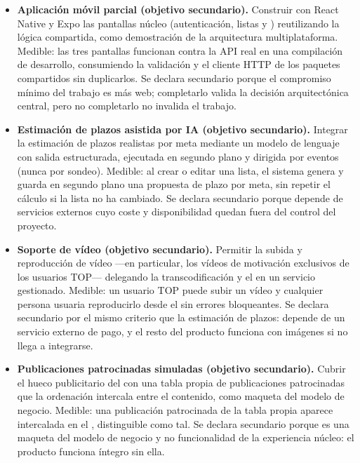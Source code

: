 \begin{itemize}
        Montar una cadena de integración continua con estrategia de fallo rápido (análisis estático, comprobación de tipos, pruebas unitarias y de integración, y pruebas \ac{E2E} como última barrera) con despliegue automático al superar todas las etapas.
        Medible: la rama principal se mantiene en verde y cada cambio validado llega a producción sin intervención manual.
  \item \textbf{Aplicación móvil parcial (objetivo secundario).}
        Construir con React Native y Expo las pantallas núcleo (autenticación, listas y ) reutilizando la lógica compartida, como demostración de la arquitectura multiplataforma.
        Medible: las tres pantallas funcionan contra la \ac{API} real en una compilación de desarrollo, consumiendo la validación y el cliente \ac{HTTP} de los paquetes compartidos sin duplicarlos.
        Se declara secundario porque el compromiso mínimo del trabajo es  más web; completarlo valida la decisión arquitectónica central, pero no completarlo no invalida el trabajo.
  \item \textbf{Estimación de plazos asistida por \ac{IA} (objetivo secundario).}
        Integrar la estimación de plazos realistas por meta mediante un modelo de lenguaje con salida estructurada, ejecutada en segundo plano y dirigida por eventos (nunca por sondeo).
        Medible: al crear o editar una lista, el sistema genera y guarda en segundo plano una propuesta de plazo por meta, sin repetir el cálculo si la lista no ha cambiado.
        Se declara secundario porque depende de servicios externos cuyo coste y disponibilidad quedan fuera del control del proyecto.
  \item \textbf{Soporte de vídeo (objetivo secundario).}
        Permitir la subida y reproducción de vídeo —en particular, los vídeos de motivación exclusivos de los usuarios TOP— delegando la transcodificación y el  en un servicio gestionado.
        Medible: un usuario TOP puede subir un vídeo y cualquier persona usuaria reproducirlo desde el  sin errores bloqueantes.
        Se declara secundario por el mismo criterio que la estimación de plazos: depende de un servicio externo de pago, y el resto del producto funciona con imágenes si no llega a integrarse.
  \item \textbf{Publicaciones patrocinadas simuladas (objetivo secundario).}
        Cubrir el hueco publicitario del  con una tabla propia de publicaciones patrocinadas que la ordenación intercala entre el contenido, como maqueta del modelo de negocio.
        Medible: una publicación patrocinada de la tabla propia aparece intercalada en el , distinguible como tal.
        Se declara secundario porque es una maqueta del modelo de negocio y no funcionalidad de la experiencia núcleo: el producto funciona íntegro sin ella.
\end{itemize}

